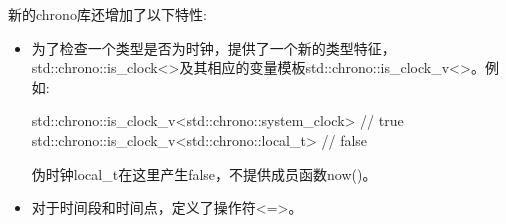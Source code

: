 新的chrono库还增加了以下特性:

\begin{itemize}
\item
为了检查一个类型是否为时钟，提供了一个新的类型特征，std::chrono::is\_clock<>及其相应的变量模板std::chrono::is\_clock\_v<>。例如:

\begin{cpp}
std::chrono::is_clock_v<std::chrono::system_clock> // true
std::chrono::is_clock_v<std::chrono::local_t> // false
\end{cpp}

伪时钟local\_t在这里产生false，不提供成员函数now()。

\item
对于时间段和时间点，定义了操作符<=>。
\end{itemize}